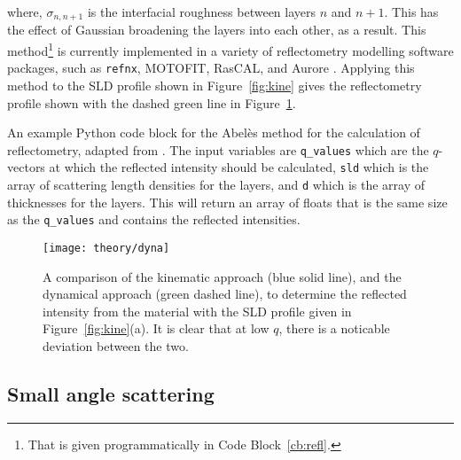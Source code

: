 %
where, $\sigma_{n,n+1}$ is the interfacial roughness between layers $n$ and $n+1$.\autocite{nevot_caracterisation_1980}
This has the effect of Gaussian broadening the layers into each other, as a result.
This method\footnote{That is given programmatically in Code Block~\protect\ref{cb:refl}.} is currently implemented in a variety of reflectometry modelling software packages, such as \texttt{refnx}, MOTOFIT, RasCAL, and Aurore \autocite{nelson_refnx_2019,nelson_co-refinement_2006,hughes_rascal_nodate,gerelli_aurore_2016-1,gerelli_aurore_2016}.
Applying this method to the SLD profile shown in Figure~\ref{fig:kine} gives the reflectometry profile shown with the dashed green line in Figure~\ref{fig:dyna}.
%
\begin{listing}[t]
    \forcerectofloat
    \centering
    \caption{An example Python code block for the Abel\`{e}s method for the calculation of reflectometry, adapted from \cite{nelson_refnx_2019}. The input variables are \texttt{q\_values} which are the $q$-vectors at which the reflected intensity should be calculated, \texttt{sld} which is the array of scattering length densities for the layers, and \texttt{d} which is the array of thicknesses for the layers. This will return an array of floats that is the same size as the \texttt{q\_values} and contains the reflected intensities.}
    
    \label{cb:refl}
\end{listing}
%
%
\begin{figure}[b]
    \centering
    \texttt{[image: theory/dyna]}
    \caption{A comparison of the kinematic approach (blue solid line), and the dynamical approach (green dashed line), to determine the reflected intensity from the material with the SLD profile given in Figure~\protect\ref{fig:kine}(a). It is clear that at low $q$, there is a noticable deviation between the two.}
    \label{fig:dyna}
\end{figure}
%


\subsection{Small angle scattering}
\label{sec:sasanal}

